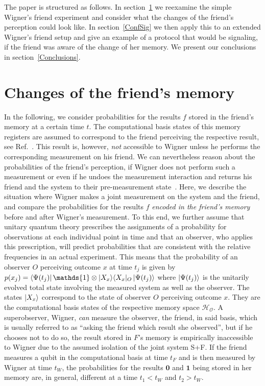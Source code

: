 \documentclass[a4paper,twocolumn,11pt,accepted=2017-05-09,dvipsnames]{quantumarticle}
\numberwithin{equation}{section}
\newcommand{\proj}[1]{|#1\rangle\langle#1|}
\begin{document}
The paper is structured as follows. In section~\ref{Changes} we reexamine the simple Wigner's friend experiment and consider what the changes of the friend's perception could look like. In section~\ref{ConfSig} we then apply this to an extended Wigner's friend setup and give an example of a protocol that would be signaling, if the friend was aware of the change of her memory. We present our conclusions in section~\ref{Conclusions}.

\section{Changes of the friend's memory}
\label{Changes}


In the following, we consider probabilities for the results $f$ stored in the friend's memory at a certain time $t$.
{The computational basis states of this memory registers are assumed to correspond to the friend perceiving the respective result, see Ref.~\cite{brukner2021qubits}. This result is, however, \emph{not} accessible to Wigner unless he performs the corresponding measurement on his friend. We can nevertheless reason about the probabilities of the friend's perception, if Wigner does not perform such a measurement or even if he undoes the measurement interaction and returns his friend and the system to their pre-measurement state~\cite{gao2019quantum}.} Here, we describe the situation where Wigner makes a joint measurement on the system and the friend, and compare the probabilities for the results $f$ \emph{encoded in the friend's memory} before and after Wigner's measurement. To this end, we further assume that unitary quantum theory prescribes the assignments of a probability for observations at each individual point in time and that an observer, who applies this prescription, will predict probabilities that are consistent with the relative frequencies in an actual experiment. {This means that the probability of an observer $O$ perceiving outcome $x$ at time $t_j$ is given by $p(x_j)= \bra{\Psi(t_j)}  \mathds{1}\otimes\proj{X_x}_O \ket{\Psi(t_j)} $ where $\ket{\Psi(t_j)}$ is the unitarily evolved total state involving the measured system as well as the observer. The states $\ket{X_x}$ correspond to the state of observer $O$ perceiving outcome $x$.  They are the computational basis states of the respective memory space $\mathcal{H_O}$. A superobserver, Wigner, \emph{can} measure the observer, the friend, in said basis, which is usually referred to as ``asking the friend which result she observed'', but if he chooses not to do so, the result stored in $F$'s memory is empirically inaccessible to Wigner due to the assumed isolation of the joint system S+F.}
If the friend measures a qubit in the computational basis at time $t_F$ and is then measured by Wigner at time $t_W$, the probabilities for the results $\bm 0$ and $\bm 1$ being stored in her memory are, in general, different at a time $t_1<t_W$ and $t_2>t_W$. 
\end{document}
